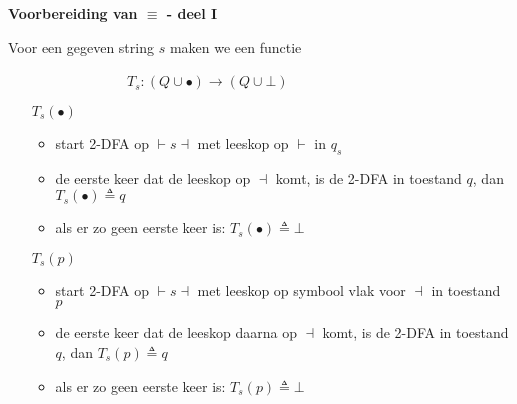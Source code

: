 \documentclass{seminar}
\newcommand{\beginm}{\vdash }
\newcommand{\eindm}{\dashv }
\begin{document}
\begin{slide}

{\bf Voorbereiding van $\equiv$ - deel I}

Voor een gegeven string $s$ maken we een functie

~~~~~~~~~~~~~~~~~$T_s: (Q \cup {\bullet}) \rightarrow (Q \cup {\bot})$

\begin{itemize}
\item[$T_s(\bullet)$]

\begin{itemize}
\item 
start 2-DFA op $\beginm s \eindm$ met leeskop op $\beginm$ in $q_s$

\item 
de eerste keer dat de leeskop op $\eindm$ komt, is de 2-DFA in
toestand $q$, dan $T_s(\bullet) \triangleq q$

\item 

als er zo geen eerste keer is: $T_s(\bullet) \triangleq \bot$
\end{itemize}



\item[$T_s(p)$]
\begin{itemize}
\item
start 2-DFA op $\beginm s \eindm$ met leeskop op symbool vlak voor $\eindm$ 
in toestand $p$
\item
de eerste keer dat de leeskop daarna op $\eindm$ komt, is de 2-DFA in
toestand $q$, dan $T_s(p) \triangleq q$

\item

als er zo geen eerste keer is: $T_s(p) \triangleq \bot$

\end{itemize}

\end{itemize}



\end{slide} 
\end{document}
